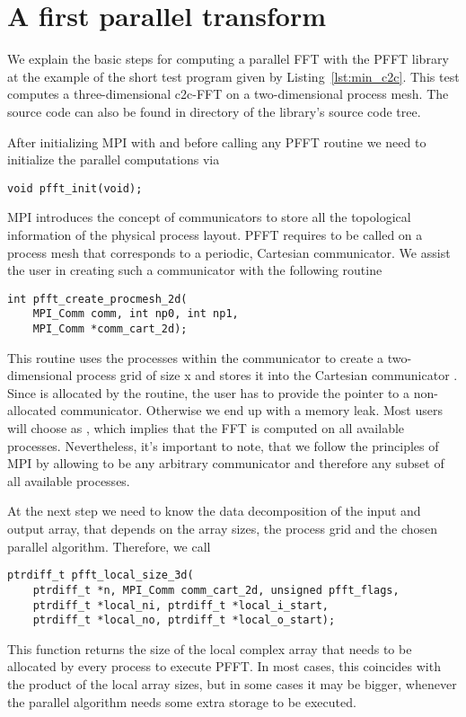 \section{A first parallel transform}

We explain the basic steps for computing a parallel FFT with the PFFT library at the example
of the short test program given by Listing~\ref{lst:min_c2c}. This test computes a three-dimensional c2c-FFT on
a two-dimensional process mesh. The source code can also be found in directory 
of the library's source code tree. 


After initializing MPI with  and before calling any PFFT routine we need to initialize
the parallel computations via
\begin{lstlisting}
void pfft_init(void);
\end{lstlisting}
MPI introduces the concept of communicators to store all the topological information of the physical process layout.
PFFT requires to be called on a process mesh that corresponds to a periodic, Cartesian communicator.
We assist the user in creating such a communicator with the following routine
\begin{lstlisting}
int pfft_create_procmesh_2d(
    MPI_Comm comm, int np0, int np1,
    MPI_Comm *comm_cart_2d);
\end{lstlisting}
This routine uses the processes within the communicator  to create a two-dimensional process
grid of size  x  and stores it into the Cartesian communicator .
Since  is allocated by the routine, the user has to provide
the pointer to a non-allocated communicator. Otherwise we end up with a memory leak.
Most users will choose  as , which implies that the FFT is computed
on all available processes. Nevertheless, it's important to note, that we follow the principles of MPI
by allowing  to be any arbitrary communicator and therefore any subset of all available processes.

At the next step we need to know the data decomposition of the input and output array, that depends on
the array sizes, the process grid and the chosen parallel algorithm. Therefore, we call
\begin{lstlisting}
ptrdiff_t pfft_local_size_3d(
    ptrdiff_t *n, MPI_Comm comm_cart_2d, unsigned pfft_flags,
    ptrdiff_t *local_ni, ptrdiff_t *local_i_start,
    ptrdiff_t *local_no, ptrdiff_t *local_o_start);
\end{lstlisting}
This function returns the size of the local complex array that needs to be allocated by every process to
execute PFFT. In most cases, this coincides with the product of the local array sizes, but in some cases
it may be bigger, whenever the parallel algorithm needs some extra storage to be executed.




